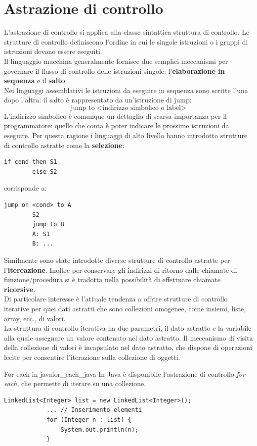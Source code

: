\documentclass[12pt]{report}
\newcommand{\nmu}{}
\begin{document}
 	\section{Astrazione di controllo}
 	L'astrazione di controllo si applica alla classe sintattica struttura di controllo. Le strutture di controllo definiscono l'ordine in cui le singole istruzioni o i gruppi di istruzioni devono essere eseguiti. \\
 	Il linguaggio macchina generalmente fornisce due semplici meccanismi per governare il flusso di controllo delle istruzioni singole: l'\textbf{elaborazione in sequenza} e il \textbf{salto}. \\
 	Nei linguaggi assemblativi le istruzioni da eseguire in sequenza sono scritte l'una dopo l'altra: il salto è rappresentato da un'istruzione di jump:
 	\[
 	\text{jump to <indirizzo simbolico o label>}
 	\]
 	L'indirizzo simbolico è comunque un dettaglio di scarsa importanza per il programmatore: quello che conta è poter indicare le prossime istruzioni da eseguire. Per questa ragione i linguaggi di alto livello hanno introdotto strutture di controllo astratte come la \textbf{selezione}:
 	\begin{lstlisting}[style=pascalstyle]
 		if cond then S1
 		else S2	\end{lstlisting}
 	corrisponde a:
 	\begin{lstlisting}[style=pascalstyle]
 		jump on <cond> to A
 		S2
 		jump to B
 		A: S1
 		B: ...\end{lstlisting}
 	Similmente sono state introdotte diverse strutture di controllo astratte per l'\textbf{itereazione}. Inoltre per conservare gli indirizzi di ritorno dalle chiamate di funzione/procedura si è tradotta nella possibilità di effettuare chiamate \textbf{ricorsive}. \\
 	Di particolare interesse è l'attuale tendenza a offrire strutture di controllo iterative per quei dati astratti che sono collezioni omogenee, come insiemi, liste, array, ecc., di valori. \\
 	La struttura di controllo iterativa ha due parametri, il dato astratto e la variabile alla quale assegnare un valore contenuto nel dato astratto. Il meccanismo di visita della collezione di valori è incapsulato nel dato astratto, che dispone di operazioni lecite per consentire l'iterazione sulla collezione di oggetti.
 	\begin{example}{\nmu For-each in java}{for_each_java}
 		In Java è disponibile l'astrazione di controllo \textit{for-each}, che permette di iterare su una collezione.
 		\begin{lstlisting}[style=javastyle]
 			LinkedList<Integer> list = new LinkedList<Integer>();
 			... // Inserimento elementi
 			for (Integer n : list) {
 				System.out.println(n);
 			}	\end{lstlisting}
 	\end{example}
\end{document}
